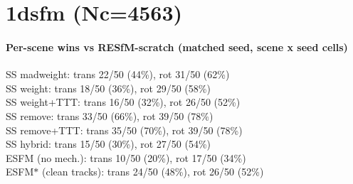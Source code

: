\documentclass[10pt]{article}
\begin{document}
\section*{1dsfm  (Nc=4563)}
\begin{center}\end{center}
\paragraph{Per-scene wins vs RESfM-scratch (matched seed, scene x seed cells)}
\indent SS madweight: trans 22/50 (44\%), rot 31/50 (62\%)\\
\indent SS weight: trans 18/50 (36\%), rot 29/50 (58\%)\\
\indent SS weight+TTT: trans 16/50 (32\%), rot 26/50 (52\%)\\
\indent SS remove: trans 33/50 (66\%), rot 39/50 (78\%)\\
\indent SS remove+TTT: trans 35/50 (70\%), rot 39/50 (78\%)\\
\indent SS hybrid: trans 15/50 (30\%), rot 27/50 (54\%)\\
\indent ESFM (no mech.): trans 10/50 (20\%), rot 17/50 (34\%)\\
\indent ESFM$\ast$ (clean tracks): trans 24/50 (48\%), rot 26/50 (52\%)\\
\end{document}
